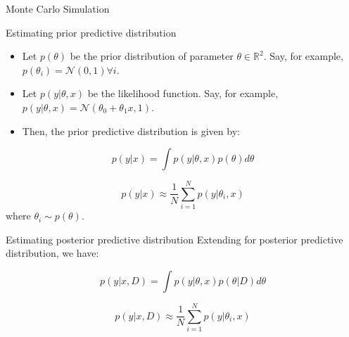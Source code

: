 \documentclass{beamer}
\begin{document}
\begin{section}{Monte Carlo Simulation}
    \begin{frame}{Estimating prior predictive distribution}
        \begin{itemize}
            \item Let $p(\theta)$ be the prior distribution of parameter $\theta \in \mathbb{R}^2$. Say, for example, $p(\theta_i) = \mathcal{N}(0, 1) \forall i$.
            \item Let $p(y |\theta, x)$ be the likelihood function. Say, for example, $p(y|\theta, x) = \mathcal{N}(\theta_0 + \theta_1 x, 1)$.
            \item Then, the prior predictive distribution is given by:
        \end{itemize}

            \begin{equation}
                p(y|x) = \int p(y|\theta, x) p(\theta) d\theta 
            \end{equation}

            \begin{equation}
                p(y|x) \approx \frac{1}{N} \sum_{i=1}^{N} p(y|\theta_i, x)
            \end{equation}
            where $\theta_i \sim p(\theta)$.
    \end{frame}

    \begin{frame}{Estimating posterior predictive distribution}
        Extending for posterior predictive distribution, we have:

        \begin{equation}
            p(y|x, D) = \int p(y|\theta, x) p(\theta|D) d\theta 
        \end{equation}

        \begin{equation}
            p(y|x, D) \approx \frac{1}{N} \sum_{i=1}^{N} p(y|\theta_i, x)
        \end{equation}
        
    \end{frame}

\end{section}
\end{document}
